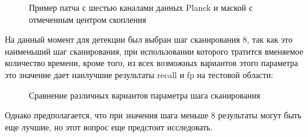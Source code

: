 \begin{figure}
    \caption{Пример патча с шестью каналами данных Planck и маской с отмеченным центром скопления}
\end{figure}

На данный момент для детекции был выбран шаг сканирования $8$, так как это наименьший шаг 
сканирования, при использовании которого тратится вменяемое количество времени, кроме того, из всех 
возможных вариантов этого параметра это значение дает наилучшие результаты recall и fp на тестовой 
области:\\
\begin{figure}
    \caption{Сравнение различных вариантов параметра шага сканирования}
\end{figure}

Однако предполагается, что при значения шага меньше $8$ результаты могут быть еще лучшие, но этот 
вопрос еще предстоит исследовать.\\

